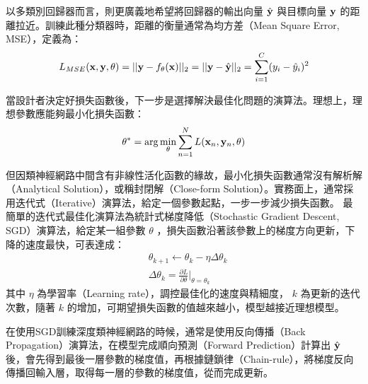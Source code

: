 以多類別回歸器而言，則更廣義地希望將回歸器的輸出向量 $ \hat{\bold{y}} $ 與目標向量 $ \bold{y} $ 的距離拉近。訓練此種分類器時，距離的衡量通常為均方差（Mean Square Error, MSE），定義為：
\begin{equation}
L_{MSE}(\bold{x} , \bold{y} , \theta) = || \bold{y} - f_{\theta}(\bold{x}) ||_2 = || \bold{y} - \hat{\bold{y}} ||_2 = \sum_{i = 1}^{C} ( y_i - \hat{y}_i )^2 
\end{equation}

當設計者決定好損失函數後，下一步是選擇解決最佳化問題的演算法。理想上，理想參數應能夠最小化損失函數：
\begin{equation}
\theta^* = \arg\min_{\theta}{ \sum_{n=1}^{N}{ {L( \bold{x}_n , \bold{y}_n , \theta)}}}
\end{equation}

但因類神經網路中間含有非線性活化函數的緣故，最小化損失函數通常沒有解析解（Analytical
Solution），或稱封閉解（Close-form Solution）。實務面上，通常採用迭代式（Iterative）演算法，給定一個參數起點，一步一步減少損失函數。
最簡單的迭代式最佳化演算法為統計式梯度降低（Stochastic Gradient Descent, SGD）演算法，給定某一組參數 $ \theta $ ，損失函數沿著該參數上的梯度方向更新，下降的速度最快，可表達成：
\begin{equation}
	\begin{aligned}
	&\theta_{k+1} \leftarrow \theta_k - \eta \Delta \theta_{k} 
	\\
	&\Delta \theta_{k} = \frac{\partial L}{\partial \theta} \biggr|_{\theta = \theta_k}
	\end{aligned}
\end{equation}
其中 $ \eta $ 為學習率（Learning rate），調控最佳化的速度與精細度， $ k $ 為更新的迭代次數，隨著 $ k $ 的增加，可期望損失函數的值越來越小，模型越接近理想模型。


在使用SGD訓練深度類神經網路的時候，通常是使用反向傳播（Back
Propagation）演算法，在模型完成順向預測（Forward
Prediction）計算出 $ \hat{\bold{y}} $ 後，會先得到最後一層參數的梯度值，再根據鏈鎖律（Chain-rule），將梯度反向傳播回輸入層，取得每一層的參數的梯度值，從而完成更新。


